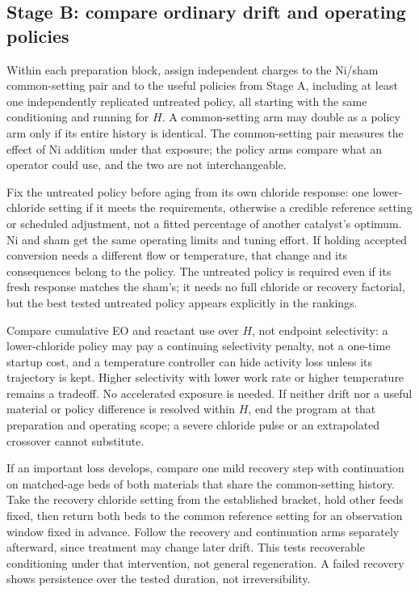 \subsection{Stage B: compare ordinary drift and operating policies}

Within each preparation block, assign independent charges to the Ni/sham common-setting pair and to the useful policies from Stage A, including at least one independently replicated untreated policy, all starting with the same conditioning and running for $H$. A common-setting arm may double as a policy arm only if its entire history is identical. The common-setting pair measures the effect of Ni addition under that exposure; the policy arms compare what an operator could use, and the two are not interchangeable.

Fix the untreated policy before aging from its own chloride response: one lower-chloride setting if it meets the requirements, otherwise a credible reference setting or scheduled adjustment, not a fitted percentage of another catalyst's optimum. Ni and sham get the same operating limits and tuning effort. If holding accepted conversion needs a different flow or temperature, that change and its consequences belong to the policy. The untreated policy is required even if its fresh response matches the sham's; it needs no full chloride or recovery factorial, but the best tested untreated policy appears explicitly in the rankings.

Compare cumulative EO and reactant use over $H$, not endpoint selectivity: a lower-chloride policy may pay a continuing selectivity penalty, not a one-time startup cost, and a temperature controller can hide activity loss unless its trajectory is kept. Higher selectivity with lower work rate or higher temperature remains a tradeoff. No accelerated exposure is needed. If neither drift nor a useful material or policy difference is resolved within $H$, end the program at that preparation and operating scope; a severe chloride pulse or an extrapolated crossover cannot substitute.

If an important loss develops, compare one mild recovery step with continuation on matched-age beds of both materials that share the common-setting history. Take the recovery chloride setting from the established bracket, hold other feeds fixed, then return both beds to the common reference setting for an observation window fixed in advance. Follow the recovery and continuation arms separately afterward, since treatment may change later drift. This tests recoverable conditioning under that intervention, not general regeneration. A failed recovery shows persistence over the tested duration, not irreversibility.

